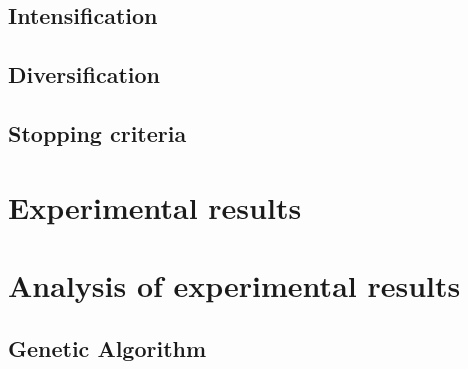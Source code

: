 \documentclass{article} %
\begin{document}
\subsection{Intensification}



\subsection{Diversification}



\subsection{Stopping criteria}




\newpage
\section{Experimental results}
\label{exp_results}





\section{Analysis of experimental results}
\label{analysis_results}


\subsection{Genetic Algorithm}
\end{document}

